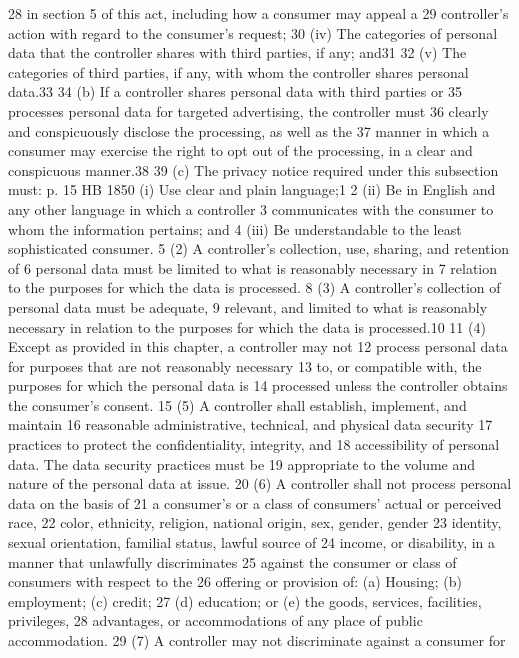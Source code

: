 28 in section 5 of this act, including how a consumer may appeal a
29 controller's action with regard to the consumer's request;
30 (iv) The categories of personal data that the controller shares
with third parties, if any; and31
32 (v) The categories of third parties, if any, with whom the
controller shares personal data.33
34 (b) If a controller shares personal data with third parties or
35 processes personal data for targeted advertising, the controller must
36 clearly and conspicuously disclose the processing, as well as the
37 manner in which a consumer may exercise the right to opt out of the
processing, in a clear and conspicuous manner.38
39 (c) The privacy notice required under this subsection must:
p. 15 HB 1850
(i) Use clear and plain language;1
2 (ii) Be in English and any other language in which a controller
3 communicates with the consumer to whom the information pertains; and
4 (iii) Be understandable to the least sophisticated consumer.
5 (2) A controller's collection, use, sharing, and retention of
6 personal data must be limited to what is reasonably necessary in
7 relation to the purposes for which the data is processed.
8 (3) A controller's collection of personal data must be adequate,
9 relevant, and limited to what is reasonably necessary in relation to
the purposes for which the data is processed.10
11 (4) Except as provided in this chapter, a controller may not
12 process personal data for purposes that are not reasonably necessary
13 to, or compatible with, the purposes for which the personal data is
14 processed unless the controller obtains the consumer's consent.
15 (5) A controller shall establish, implement, and maintain
16 reasonable administrative, technical, and physical data security
17 practices to protect the confidentiality, integrity, and
18 accessibility of personal data. The data security practices must be
19 appropriate to the volume and nature of the personal data at issue.
20 (6) A controller shall not process personal data on the basis of
21 a consumer's or a class of consumers' actual or perceived race,
22 color, ethnicity, religion, national origin, sex, gender, gender
23 identity, sexual orientation, familial status, lawful source of
24 income, or disability, in a manner that unlawfully discriminates
25 against the consumer or class of consumers with respect to the
26 offering or provision of: (a) Housing; (b) employment; (c) credit;
27 (d) education; or (e) the goods, services, facilities, privileges,
28 advantages, or accommodations of any place of public accommodation.
29 (7) A controller may not discriminate against a consumer for
